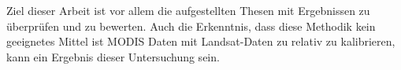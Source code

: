 \documentclass[11pt]{report}
\begin{document}
Ziel dieser Arbeit ist vor allem die aufgestellten Thesen mit Ergebnissen zu überprüfen und zu bewerten. Auch die Erkenntnis, dass diese Methodik kein geeignetes Mittel ist MODIS Daten mit Landsat-Daten zu relativ zu kalibrieren, kann ein Ergebnis dieser Untersuchung sein.







% 
% 
\end{document}
